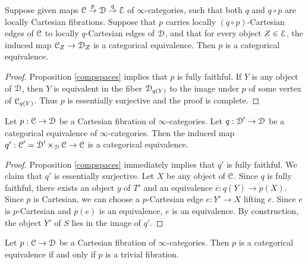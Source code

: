 \begin{corollary}\label{usefir}
Suppose given maps $\operatorname{\mathcal{C}} \stackrel{p}{\rightarrow} \operatorname{\mathcal{D}} \stackrel{q}{\rightarrow} \operatorname{\mathcal{E}}$ of $\infty$-categories, such that both $q$ and $q \circ p$ are locally Cartesian fibrations. Suppose that $p$ carries
locally $(q \circ p)$-Cartesian edges of $\operatorname{\mathcal{C}}$ to locally $q$-Cartesian edges of $\operatorname{\mathcal{D}}$, and that for every object $Z \in \operatorname{\mathcal{E}}$, the induced map $\operatorname{\mathcal{C}}_{Z} \rightarrow \operatorname{\mathcal{D}}_{Z}$ is a categorical equivalence. Then $p$ is a categorical equivalence.
\end{corollary}

\begin{proof}
Proposition \ref{compspaces} implies that $p$ is fully faithful. If $Y$ is any object of $\operatorname{\mathcal{D}}$, then $Y$ is equivalent in the fiber $\operatorname{\mathcal{D}}_{q(Y)}$ to the image under $p$ of some vertex of $\operatorname{\mathcal{C}}_{q(Y)}$. Thus $p$ is essentially surjective and the proof is complete.
\end{proof}

\begin{corollary}\label{usesec}
Let $p: \operatorname{\mathcal{C}} \rightarrow \operatorname{\mathcal{D}}$ be a Cartesian fibration of $\infty$-categories. Let $q: \operatorname{\mathcal{D}}' \rightarrow \operatorname{\mathcal{D}}$ be a categorical equivalence of $\infty$-categories. Then the induced map $q': \operatorname{\mathcal{C}}' = \operatorname{\mathcal{D}}' \times_{\operatorname{\mathcal{D}}} \operatorname{\mathcal{C}} \rightarrow \operatorname{\mathcal{C}}$ is a categorical equivalence.
\end{corollary}

\begin{proof}
Proposition \ref{compspaces} immediately implies that $q'$ is fully faithful. We claim that $q'$ is essentially surjective. Let $X$ be any object of $\operatorname{\mathcal{C}}$. Since $q$ is fully faithful, there exists an object $y$ of $T'$ and an equivalence $\overline{e}: q(Y) \rightarrow p(X)$. Since $p$ is Cartesian, we can choose a $p$-Cartesian edge $e: Y' \rightarrow X$ lifting $\overline{e}$. Since $e$ is $p$-Cartesian and $p(e)$ is an equivalence, $e$ is an equivalence. By construction, the object $Y'$ of $S$ lies in the image of $q'$.
\end{proof}

\begin{corollary}\label{heath}
Let $p: \operatorname{\mathcal{C}} \rightarrow \operatorname{\mathcal{D}}$ be a Cartesian fibration of $\infty$-categories. Then $p$ is a categorical equivalence if and only if $p$ is a trivial fibration.
\end{corollary}

